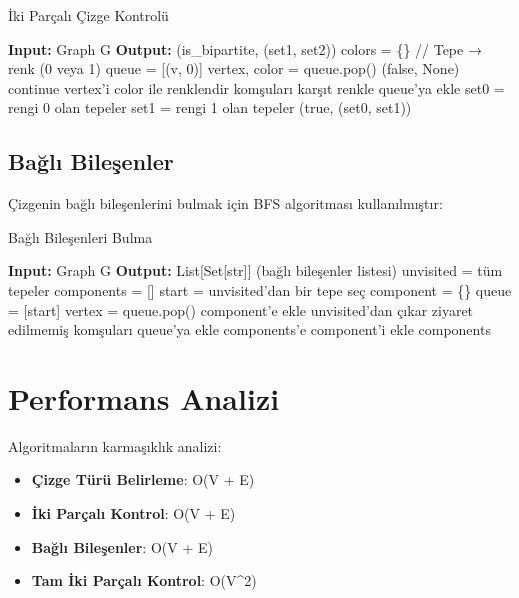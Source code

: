 \documentclass[12pt]{article}
\begin{document}
\begin{algorithm}
\caption{İki Parçalı Çizge Kontrolü}
\begin{algorithmic}
\STATE \textbf{Input:} Graph G
\STATE \textbf{Output:} (is\_bipartite, (set1, set2))
\STATE
\STATE colors = \{\} // Tepe → renk (0 veya 1)
        \STATE queue = [(v, 0)]
            \STATE vertex, color = queue.pop()
                    \RETURN (false, None)
                \ENDIF
                \STATE continue
            \ENDIF
            \STATE vertex'i color ile renklendir
            \STATE komşuları karşıt renkle queue'ya ekle
        \ENDWHILE
    \ENDIF
\ENDFOR
\STATE set0 = rengi 0 olan tepeler
\STATE set1 = rengi 1 olan tepeler
\RETURN (true, (set0, set1))
\end{algorithmic}
\end{algorithm}

\subsection{Bağlı Bileşenler}
Çizgenin bağlı bileşenlerini bulmak için BFS algoritması kullanılmıştır:

\begin{algorithm}
\caption{Bağlı Bileşenleri Bulma}
\begin{algorithmic}
\STATE \textbf{Input:} Graph G
\STATE \textbf{Output:} List[Set[str]] (bağlı bileşenler listesi)
\STATE
\STATE unvisited = tüm tepeler
\STATE components = []
    \STATE start = unvisited'dan bir tepe seç
    \STATE component = \{\}
    \STATE queue = [start]
        \STATE vertex = queue.pop()
            \STATE component'e ekle
            \STATE unvisited'dan çıkar
            \STATE ziyaret edilmemiş komşuları queue'ya ekle
        \ENDIF
    \ENDWHILE
    \STATE components'e component'i ekle
\ENDWHILE
\RETURN components
\end{algorithmic}
\end{algorithm}

\section{Performans Analizi}
Algoritmaların karmaşıklık analizi:

\begin{itemize}
    \item \textbf{Çizge Türü Belirleme}: O(V + E)
    \item \textbf{İki Parçalı Kontrol}: O(V + E)
    \item \textbf{Bağlı Bileşenler}: O(V + E)
    \item \textbf{Tam İki Parçalı Kontrol}: O(V\^{}2)
\end{itemize}
\end{document}
